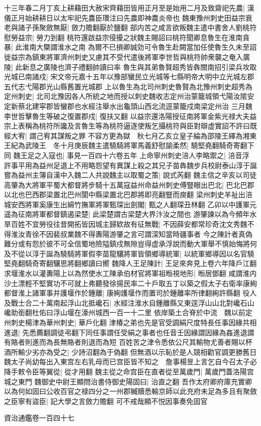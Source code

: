 十三年春二月丁亥上耕藉田大赦宋齊藉田皆用正月至是始用二月及致齋祀先農|{
	漢儀正月始耕耕日以太牢祀先農臣瓚注曰先農即神農炎帝也}
魏東豫州刺史田益宗衰老與諸子孫聚斂無厭|{
	斂力贍翻厭於鹽翻}
部内苦之咸言欲叛魏主遣中書舍人劉桃符慰勞益宗|{
	勞力到翻}
桃符還啟益宗侵擾之狀魏主賜詔曰桃符聞卿息魯生在淮南貪暴|{
	此淮南大槩謂淮水之南}
為爾不已損卿誠効可令魯生赴闕當加任使魯生久未至詔徙益宗為鎮東將軍濟州刺史又慮其不受代遣後將軍李世哲與桃符帥衆襲之奄入廣陵|{
	此新息之廣陵也濟子禮翻帥讀曰率}
魯生與其弟魯賢超秀皆犇關南招引梁兵攻取光城已南諸戍|{
	宋文帝元嘉十五年以豫部蠻民立光城等七縣明帝大明中立光城左郡五代志弋陽郡光山縣舊置光城郡}
上以魯生為北司州刺史魯賢為北豫州刺史超秀為定州刺史|{
	北司北豫因各人所統之地而授以刺史魏收志定州治蒙籠城領弋陽汝隂安定新蔡北建寜郡皆蠻郡也水經注舉水出龜頭山西北流逕蒙籠戍南梁定州治}
三月魏李世哲擊魯生等破之復置郡戍|{
	復扶又翻}
以益宗還洛陽授征南將軍金紫光禄大夫益宗上表稱為桃符所讒及言魯生等為桃符逼逐使叛乞攝桃符與臣對辯虚實詔不許曰既經大宥|{
	謂己宥其謀叛之罪}
不容方更為獄　秋七月乙亥立皇子綸為邵陵王繹為湘東王紀為武陵王　冬十月庚辰魏主遣驍騎將軍馬義舒慰諭柔然|{
	驍堅堯翻騎奇寄翻下同}
魏王足之入寇也|{
	事見一百四十六卷五年}
上命寧州刺史涪人李略禦之|{
	涪音浮}
許事平用為益州足退上不用略怨望有異謀上殺之其兄子苗犇魏步兵校尉泰山淳于誕嘗為益州主簿自漢中入魏二人共說魏主以取蜀之策|{
	說式芮翻}
魏主信之辛亥以司徒高肇為大將軍平蜀大都督將步騎十五萬寇益州命益州刺史傅豎眼出巴北|{
	巴北巴郡以北也巴西郡梁置北巴州閬中縣梁置北巴郡將即亮翻豎而庾翻}
梁州刺史羊祉出涪城安西將軍奚康生出綿竹撫軍將軍甄琛出劍閣|{
	甄之人翻琛丑林翻}
乙卯以中護軍元遥為征南將軍都督鎮遏梁楚|{
	此梁楚謂古梁楚大界汴汝之間也}
游肇諫以為今頻年水旱百姓不宜勞役往昔開拓皆因城主歸欵故有征無戰|{
	不因薛安都常珍奇沈文秀魏不得淮汝青徐不因裴叔業魏不得夀陽游肇之言可謂深知當時疆事者}
今之陳計者真偽難分或有怨於彼不可全信蜀地險隘鎮戍無隙豈得虚承浮說而動大軍舉不慎始悔將何及不從以淳于誕為驍騎將軍假李苗龍驤將軍皆領鄉導統軍|{
	以統軍鄉導因以名官驍堅堯翻騎奇寄翻驤思將翻鄉讀曰嚮}
魏降人王足陳計|{
	王足來奔見上卷六年降戶江翻}
求堰淮水以灌夀陽上以為然使水工陳承伯材官將軍祖暅視地形|{
	暅居鄧翻}
咸謂淮内沙土漂輕不堅實功不可就上弗聽發徐揚民率二十戶取五丁以築之假太子右衛率康絢都督淮上諸軍事并護堰作於鍾離|{
	康絢護堰作而置司於鍾離率所律翻絢許縣翻}
役人及戰士合二十萬南起浮山北抵巉石|{
	水經注淮水自鍾離縣又東逕浮山山北對巉石山巉助銜翻杜佑曰浮山堰在濠州城西一百一十二里}
依岸築土合脊於中流　魏以前定州刺史楊津為華州刺史|{
	華戶化翻}
津椿之弟也先是官受調絹尺度特長任事因緣共相進退|{
	先悉薦翻調徒弔翻下同任事謂任受絹之事者也任音壬因緣謂因緣為姦進退謂有賂者則進而為長無賂者則退而為短}
百姓苦之津令悉依公尺其輸物尤善者賜以杯酒所輸少劣亦為受之|{
	少詩沼翻為于偽翻}
但無酒以示恥於是人競相勸官調更勝舊日　魏太子尚幼每出入東宫左右乳母而已宫臣皆不知之　詹事楊昱上言乞自今召太子必降手敕令臣等翼從|{
	從才用翻}
魏主從之命宫臣在直者從至萬歲門|{
	萬歲門蓋洛陽宫城之東門}
魏御史中尉王顯問治書侍御史陽固曰|{
	治直之翻}
吾作太府卿府庫充實卿以為何如固曰公收百官之禄四分之一州郡贓贖悉輸京師以此充府未足為多且有聚斂之臣寧有盜臣|{
	記大學之言斂力贍翻}
可不戒哉顯不悦因事奏免固官

資治通鑑卷一百四十七
